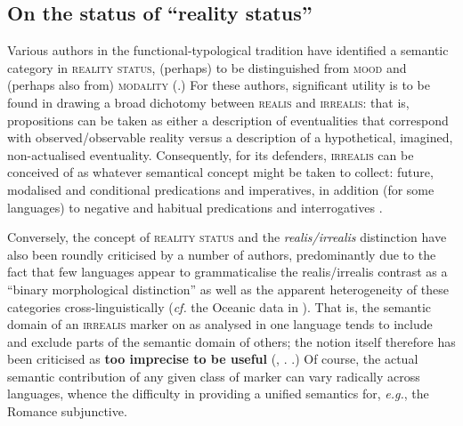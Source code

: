 \subsection{On the status of ``reality status''}
Various authors in the functional-typological tradition have identified a semantic category in \textsc{reality status}, (perhaps) to be distinguished from \textsc{mood} and (perhaps also from) \textsc{modality} (\citealp[see][]{Bowern1998,Elliott2000,Roberts1990a,Michael2014,McGregor2006,Mithun1995,Chafe1995}.) For these authors, significant utility is to be found in drawing a broad dichotomy between \textsc{realis} and \textsc{irrealis}: that is, propositions can be taken as either a description of eventualities that correspond with observed/observable reality versus a description of a hypothetical, imagined, non-actualised eventuality. Consequently, for its defenders, \textsc{irrealis} can be conceived of as whatever semantical concept might be taken to collect: future, modalised and conditional predications and imperatives, in addition (for some languages) to negative and habitual predications and interrogatives \citetext{\citealp*[see also][]{Palmer2001,Givon1994,Plungian2005,VonPrincea}}.

Conversely, the concept of \textsc{reality status} and the \textit{realis/irrealis} distinction have also been roundly criticised by a number of authors, predominantly due to the fact that few languages appear to grammaticalise the realis/irrealis contrast as a ``binary morphological distinction'' as well as the apparent heterogeneity of these categories cross-linguistically (\textit{cf.} the Oceanic data in \citealp[][]{VonPrincea}). That is, the semantic domain of an \textsc{irrealis} marker on as analysed in one language tends to include and exclude parts of the semantic domain of others; the notion itself therefore has been criticised as \textbf{too imprecise to be useful} (\citealp[see][238]{Bybee1994}, \citealp[\textit{apud}][158\textit{ff}]{Foley1986}. \citealp[See also, \textit{e.g.},][]{Bybee1998,Portner2018a,Haan2012}.) Of course, the actual semantic contribution of any given class of marker can vary radically across languages, whence the difficulty in providing a unified semantics for, \textit{e.g.}, the Romance subjunctive.

